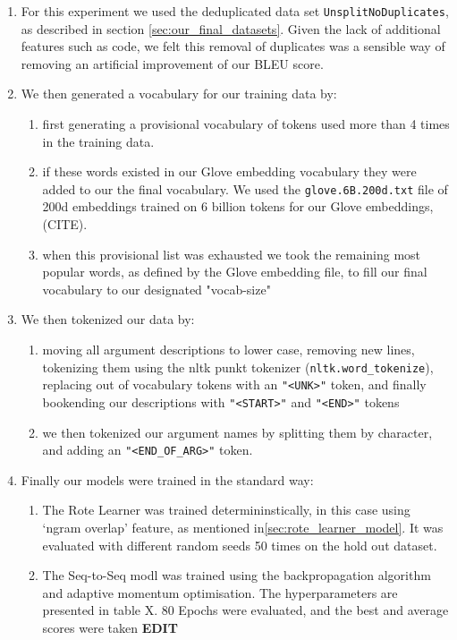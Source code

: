 \begin{enumerate}
    \item For this experiment we used the deduplicated data set \texttt{UnsplitNoDuplicates}, as described in section \ref{sec:our_final_datasets}. 
    Given the lack of additional features such as code, we felt this removal of duplicates was a sensible way of removing an artificial improvement of our BLEU score. 
    \item We then generated a vocabulary for our training data by:
    \begin{enumerate}
        \item first generating a provisional vocabulary of tokens used more than 4 times in the training data.
        \item if these words existed in our Glove embedding vocabulary they were added to our the final vocabulary. We used the  \texttt{glove.6B.200d.txt} file of 200d embeddings trained on 6 billion tokens for our Glove embeddings, (CITE). 
        \item when this provisional list was exhausted we took the remaining most popular words, as defined by the Glove embedding file, to fill our final vocabulary to our designated "vocab-size"
    \end{enumerate}

    \item We then tokenized our data by: 
     \begin{enumerate}
         \item moving all argument descriptions to lower case, removing new lines, tokenizing them using the nltk punkt tokenizer (\texttt{nltk.word_tokenize}), replacing out of vocabulary tokens with an \texttt{"<UNK>"} token, and finally bookending our descriptions with \texttt{"<START>"} and \texttt{"<END>"} tokens
         \item we then tokenized our argument names by splitting them by character, and adding an \texttt{"<END_OF_ARG>"} token.
     \end{enumerate}

    \item Finally our models were trained in the standard way:
    \begin{enumerate}
        \item The Rote Learner was trained determininstically, in this case using `ngram overlap' feature, as mentioned in\ref{sec:rote_learner_model}. It was evaluated with different random seeds 50 times on the hold out dataset.
        \item The Seq-to-Seq modl was trained using the backpropagation algorithm and adaptive momentum optimisation. The hyperparameters are presented in table X. 80 Epochs were evaluated, and the best and average scores were taken \textbf{EDIT}
    \end{enumerate}


\end{enumerate}
